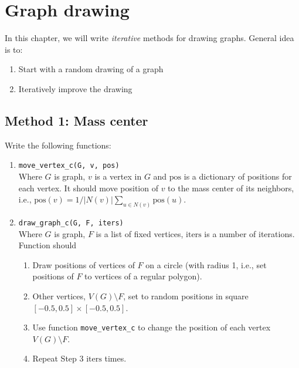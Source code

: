 \chapter{Graph drawing}

In this chapter, we will write \emph{iterative} methods for drawing graphs. General idea is to:
\begin{enumerate}
\item Start with a random drawing of a graph
\item Iteratively improve the drawing
\end{enumerate}

\section{Method 1: Mass center}

Write the following functions:
\begin{enumerate}
\item \verb|move_vertex_c(G, v, pos)|\\
    Where $G$ is graph, $v$ is a vertex in $G$ and $\mathrm{pos}$ is a dictionary of positions for each vertex. It should move position of $v$ to the mass center of its neighbors, i.e., $\mathrm{pos}(v) = 1/|N(v)| \sum_{u \in N(v)} \mathrm{pos}(u)$.
\item \verb|draw_graph_c(G, F, iters)|\\
    Where $G$ is graph, $F$ is a list of fixed vertices, $\mathrm{iters}$ is a number of iterations. Function should
    \begin{enumerate}
        \item Draw positions of vertices of $F$ on a circle (with radius 1, i.e., set positions of $F$ to vertices of a regular polygon).
        \item Other vertices, $V(G)\setminus F$, set to random positions in square $[-0.5, 0.5] \times [-0.5, 0.5]$.
        \item Use function \verb|move_vertex_c| to change the position of each vertex $V(G)\setminus F$.
        \item Repeat Step 3 $\mathrm{iters}$ times.
    \end{enumerate}
\end{enumerate}

